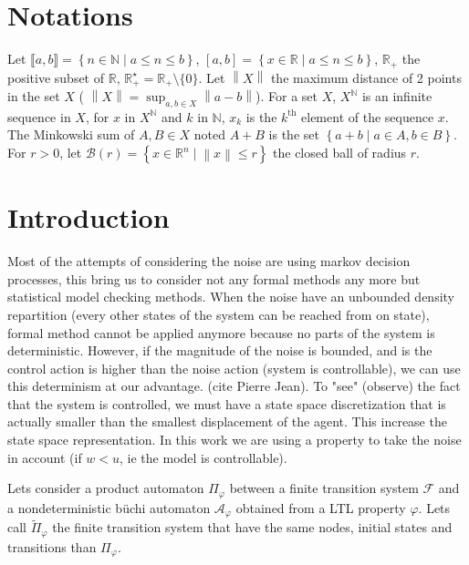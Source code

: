 \section{Notations}

Let $\llbracket a,b \rrbracket = \left \{n \in \mathbb{N} \mid a \leq n \leq b \right \}$, $\left [ a,b \right ]= \left \{x \in \mathbb{R} \mid a \leq n \leq b \right \}$, $\mathbb{R}_+$ the positive subset of $\mathbb{R}$, $\mathbb{R}_+^\star = \mathbb{R}_+ \setminus \{0\}$.
Let $\left \| X \right \|$ the maximum distance of 2 points in the set $X$ ( $\left \| X \right \| = \sup_{a,b \in X} \left \| a-b\right \|$).
For a set $X$, $X^{\mathbb{N}}$ is an infinite sequence in $X$, for $x$ in $X^{\mathbb{N}}$ and $k$ in $\mathbb{N}$, $x_k$ is the $k^{\textrm{th}}$ element of the sequence $x$.
The Minkowski sum of $A,B \in X$ noted $A+B$ is the set $\left \{a+b \mid a \in A, b\in B \right \}$.
For $r>0$, let $\mathcal{B}(r) = \left \{ x \in \mathbb{R}^n \mid \left \| x \right \| \leq r \right \}$ the closed ball of radius $r$.

\section{Introduction}
Most of the attempts of considering the noise are using markov decision processes, this bring us to consider not any formal methods any more but statistical model checking methods. When the noise have an unbounded density repartition (every other states of the system can be reached from on state), formal method cannot be applied anymore because no parts of the system is deterministic. However, if the magnitude of the noise is bounded, and is the control action is higher than the noise action (system is controllable), we can use this determinism at our advantage. (cite Pierre Jean).
To "see" (observe) the fact that the system is controlled, we must have a state space discretization that is actually smaller than the smallest displacement of the agent. This increase the state space representation. In this work we are using a property to take the noise in account (if $w<u$, ie the model is controllable).

Lets consider a product automaton $\Pi_\varphi$ between a finite transition system $\mathcal{F}$ and a nondeterministic b\"uchi automaton $\mathcal{A}_\varphi$ obtained from a LTL property $\varphi$. Lets call $\widetilde{\Pi}_\varphi$ the finite transition system that have the same nodes, initial states and transitions than $\Pi_\varphi$.

